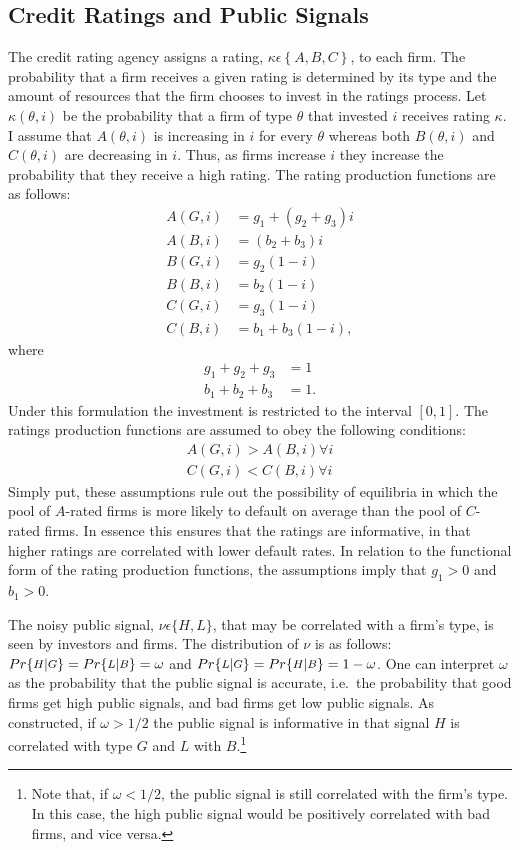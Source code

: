 \documentclass[titlepage]{article}
\begin{document}
\subsection{Credit Ratings and Public Signals}
The credit rating agency assigns a rating, $\kappa\epsilon\left\{A,B,C\right\}$, to each firm. The probability that a firm receives a given rating is determined by its type and the amount of resources that the firm chooses to invest in the ratings process. Let $\kappa(\theta,i)$ be the probability that a firm of type $\theta$ that invested $i$ receives rating $\kappa$. I assume that $A(\theta,i)$ is increasing in $i$ for every $\theta$ whereas both $B(\theta,i)$ and $C(\theta,i)$ are decreasing in $i$. Thus, as firms increase $i$ they increase the probability that they receive a high rating. The rating production functions are as follows:
\begin{align*}
	A(G,i) & = g_{1} + (g_{2}+g_{3})i\\
	A(B,i) & =         (b_{2}+b_{3})i\\
	B(G,i) & =          g_{2}(1-i )\\
	B(B,i) & =          b_{2}(1-i )\\
	C(G,i) & =          g_{3}(1-i )\\
	C(B,i) & = b_{1} +  b_{3}(1-i ),
\end{align*}
where
\begin{align*}
g_{1}+g_{2}+g_{3} & =1\\
b_{1}+b_{2}+b_{3} & =1.
\end{align*}
Under this formulation the investment is restricted to the interval $[0,1]$. The ratings production functions are assumed to obey the following conditions:
\begin{align*} 
A(G,i)>A(B,i) \forall i \\
C(G,i)<C(B,i) \forall i 
\end{align*}
Simply put, these assumptions rule out the possibility of equilibria in which the pool of $A$-rated firms is more likely to default on average than the pool of $C$-rated firms. In essence this ensures that the ratings are informative, in that higher ratings are correlated with lower default rates. In relation to the functional form of the rating production functions, the assumptions imply that $g_{1}>0$ and $b_{1}>0$.

The noisy public signal, $\nu\epsilon \{H,L\}$, that may be correlated with a firm's type, is seen by investors and firms. The distribution of $\nu$ is as follows: $Pr \{\medmath{H} | \medmath{G} \}=Pr \{\medmath{L} | \medmath{B} \}=\omega$ and $Pr \{\medmath{L} | \medmath{G} \}=Pr \{\medmath{H} | \medmath{B} \}=1-\omega$. One can interpret $\omega$ as the probability that the public signal is accurate, i.e.\ the probability that good firms get high public signals, and bad firms get low public signals. As constructed, if $\omega > 1/2$ the public signal is informative in that signal $H$ is correlated with type $G$ and $L$ with $B$.\footnote{Note that, if $\omega<1/2$, the public signal is still correlated with the firm's type. In this case, the high public signal would be positively correlated with bad firms, and vice versa.}
\end{document}
